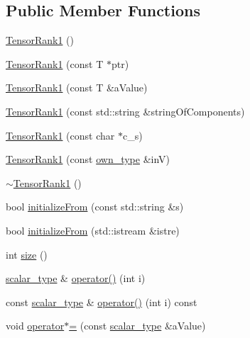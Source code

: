 \subsection*{Public Member Functions}
\begin{DoxyCompactItemize}
\item 
\hyperlink{classcofe_1_1TensorRank1_a30a16fb0f92c1afb2205756462a1a077}{Tensor\-Rank1} ()
\item 
\hyperlink{classcofe_1_1TensorRank1_abdd47f9e43f6bcc20c3e2c3f6504df6e}{Tensor\-Rank1} (const T $\ast$ptr)
\item 
\hyperlink{classcofe_1_1TensorRank1_ad900a35a693cafd25af386fb49007b1c}{Tensor\-Rank1} (const T \&a\-Value)
\item 
\hyperlink{classcofe_1_1TensorRank1_ab99a1790a5206100890ebf30c6a44924}{Tensor\-Rank1} (const std\-::string \&string\-Of\-Components)
\item 
\hyperlink{classcofe_1_1TensorRank1_a1905f852a2a4870d31ccd4c362767cc1}{Tensor\-Rank1} (const char $\ast$c\-\_\-s)
\item 
\hyperlink{classcofe_1_1TensorRank1_a156638b46d19e815506ae3525d792194}{Tensor\-Rank1} (const \hyperlink{classcofe_1_1TensorRank1_aa4dd23616b69d69a174a7d52083f0d0c}{own\-\_\-type} \&in\-V)
\item 
\hyperlink{classcofe_1_1TensorRank1_afd31985bb3aaa96d8755d1094f3e3afc}{$\sim$\-Tensor\-Rank1} ()
\item 
bool \hyperlink{classcofe_1_1TensorRank1_a48e9f9252bca274e5971bcad88ec561d}{initialize\-From} (const std\-::string \&s)
\item 
bool \hyperlink{classcofe_1_1TensorRank1_adfb96355533d579a495cb1ea4737bd91}{initialize\-From} (std\-::istream \&istre)
\item 
int \hyperlink{classcofe_1_1TensorRank1_a42a0392686bf3c1943bc732f28dc1604}{size} ()
\item 
\hyperlink{classcofe_1_1TensorRank1_a10a89d234fbdb6695e1da39745f998c6}{scalar\-\_\-type} \& \hyperlink{classcofe_1_1TensorRank1_aeb61804630a18e5543a8f81153c80d29}{operator()} (int i)
\item 
const \hyperlink{classcofe_1_1TensorRank1_a10a89d234fbdb6695e1da39745f998c6}{scalar\-\_\-type} \& \hyperlink{classcofe_1_1TensorRank1_a38d0ed7810ceaa6487fc72efc2c375fc}{operator()} (int i) const 
\item 
void \hyperlink{classcofe_1_1TensorRank1_a7fd7066eb9c98f386c7f509cb15a6737}{operator$\ast$=} (const \hyperlink{classcofe_1_1TensorRank1_a10a89d234fbdb6695e1da39745f998c6}{scalar\-\_\-type} \&a\-Value)

\end{DoxyCompactItemize}

